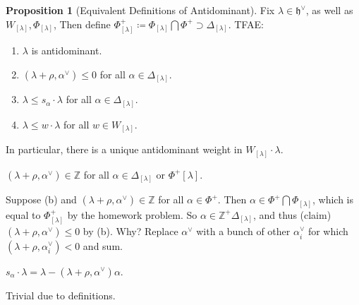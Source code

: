 \documentclass[11pt]{scrartcl}
\theoremstyle{definition}
\theoremstyle{theorem}
\newtheorem{proposition}[theorem]{Proposition}
\theoremstyle{proof}
\newenvironment{proof}
{\pushQED{$\qed$}\pf}
{\par\popQED\endpf}
\theoremstyle{definition}
\theoremstyle{break}
\theoremstyle{problem}
\providecommand{\tightlist}{%
  \setlength{\itemsep}{0pt}\setlength{\parskip}{0pt}}
\newcommand{\ZZ}[0]{{\mathbb{Z}}}
\newcommand{\definedas}[0]{\coloneqq}
\newcommand{\dual}[0]{^\vee}
\newcommand{\intersect}[0]{\bigcap}
\newcommand{\lieh}[0]{{\mathfrak{h}}}
\renewcommand{\qed}[0]{\hfill\blacksquare}
\begin{document}
\begin{proposition}[Equivalent Definitions of Antidominant]

Fix \(\lambda\in\lieh\dual\), as well as
\(W_{[\lambda]}, \Phi_{[\lambda]}\), Then define
\(\Phi^+_{[\lambda]} \definedas \Phi_{[\lambda]} \intersect \Phi^+ \supset \Delta_{[\lambda]}\).
TFAE:

\begin{enumerate}
\def\labelenumi{\alph{enumi}.}
\tightlist
\item
  \(\lambda\) is antidominant.
\item
  \((\lambda + \rho, \alpha\dual) \leq 0\) for all
  \(\alpha\in \Delta_{[\lambda]}\).
\item
  \(\lambda \leq s_\alpha \cdot \lambda\) for all
  \(\alpha \in \Delta_{[\lambda]}\).
\item
  \(\lambda \leq w\cdot \lambda\) for all \(w\in W_{[\lambda]}\).
\end{enumerate}

In particular, there is a unique antidominant weight in
\(W_{[\lambda]} \cdot \lambda\).\end{proposition}

\begin{proof}[a implies b]

\((\lambda + \rho, \alpha\dual) \in \ZZ\) for all
\(\alpha \in \Delta_{[\lambda]}\) or \(\Phi^+{[\lambda]}\).\end{proof}

\begin{proof}[b implies a]

Suppose (b) and \((\lambda + \rho, \alpha\dual) \in \ZZ\) for all
\(\alpha\in\Phi^+\). Then
\(\alpha \in \Phi^+ \intersect \Phi_{[\lambda]}\), which is equal to
\(\Phi^+_{[\lambda]}\) by the homework problem. So
\(\alpha \in \ZZ^+ \Delta_{[\lambda]}\), and thus (claim)
\((\lambda + \rho, \alpha\dual) \leq 0\) by (b). Why? Replace
\(\alpha\dual\) with a bunch of other \(\alpha_i\dual\) for which
\((\lambda + \rho, \alpha_i\dual) < 0\) and sum.\end{proof}

\begin{proof}[b iff c]

\(s_\alpha \cdot \lambda = \lambda - (\lambda + \rho, \alpha\dual)\alpha\).\end{proof}

\begin{proof}[d implies c]

Trivial due to definitions.\end{proof}
\end{document}
